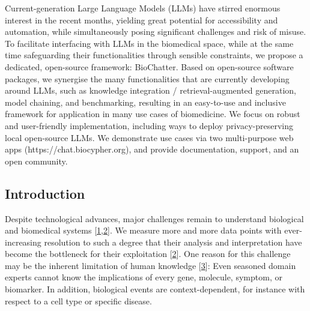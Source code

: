 Current-generation Large Language Models (LLMs) have stirred enormous interest in the recent months, yielding great potential for accessibility and automation, while simultaneously posing significant challenges and risk of misuse.
To facilitate interfacing with LLMs in the biomedical space, while at the same time safeguarding their functionalities through sensible constraints, we propose a dedicated, open-source framework: BioChatter.
Based on open-source software packages, we synergise the many functionalities that are currently developing around LLMs, such as knowledge integration / retrieval-augmented generation, model chaining, and benchmarking, resulting in an easy-to-use and inclusive framework for application in many use cases of biomedicine.
We focus on robust and user-friendly implementation, including ways to deploy privacy-preserving local open-source LLMs.
We demonstrate use cases via two multi-purpose web apps (https://chat.biocypher.org), and provide documentation, support, and an open community.

\hypertarget{introduction}{%
\subsection{Introduction}\label{introduction}}

Despite technological advances, major challenges remain to understand biological and biomedical systems {[}\protect\hyperlink{ref-195HIa77n}{1},\protect\hyperlink{ref-1AZn5l2ah}{2}{]}.
We measure more and more data points with ever-increasing resolution to such a degree that their analysis and interpretation have become the bottleneck for their exploitation {[}\protect\hyperlink{ref-1AZn5l2ah}{2}{]}.
One reason for this challenge may be the inherent limitation of human knowledge {[}\protect\hyperlink{ref-q5vfV9nk}{3}{]}: Even seasoned domain experts cannot know the implications of every gene, molecule, symptom, or biomarker.
In addition, biological events are context-dependent, for instance with respect to a cell type or specific disease.

